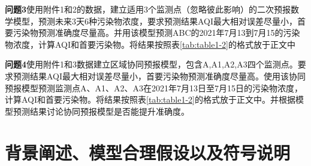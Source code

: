 \documentclass[bwprint]{gmcmthesis}
\numberwithin{figure}{section}
\begin{document}
\textbf{问题3}使用附件1和2的数据，建立适用3个监测点（忽略彼此影响）的二次预报数学模型，预测未来3天6种污染物浓度，要求预测结果AQI最大相对误差尽量小，首要污染物预测准确度尽量高。并用该模型预测ABC的2021年7月13到7月15的污染物浓度，计算AQI和首要污染物。将结果按照表\ref{tab:table1-2}的格式放于正文中
\begin{table}[h!]
	\caption{AQI计算结果表}\label{tab:table1-2}
	\begin{center}
	\end{center}
\end{table}


\textbf{问题4}使用附件1和3数据建立区域协同预报模型，包含A,A1,A2,A3四个监测点。要求预测结果AQI最大相对误差尽量小，首要污染物预测准确度尽量高。使用该协同预报模型预测监测点A、A1、A2、A3在2021年7月13日至7月15日的污染物浓度，计算AQI和首要污染物。将结果按照表\ref{tab:table1-2}的格式放于正文中。并根据模型预测结果讨论协同预报模型是否能提升准确度。

\section{背景阐述、模型合理假设以及符号说明}
\end{document}
